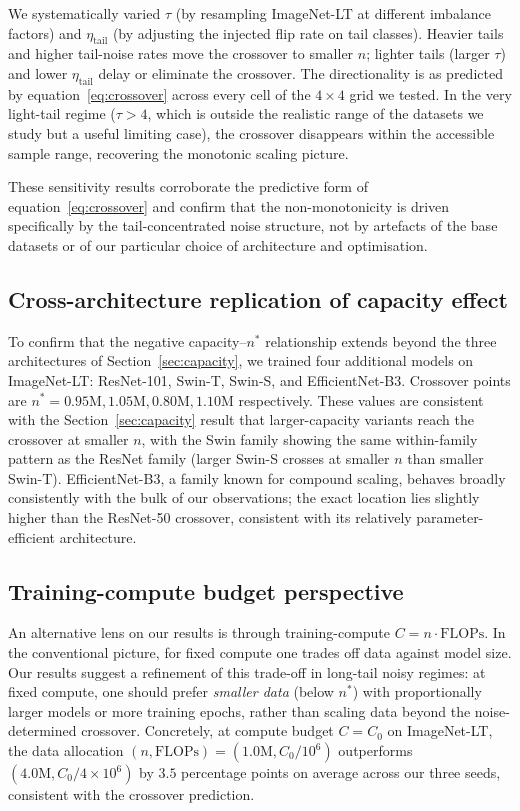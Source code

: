 \documentclass[11pt]{article}
\begin{document}
We systematically varied $\tau$ (by resampling ImageNet-LT at different imbalance factors) and $\eta_{\mathrm{tail}}$ (by adjusting the injected flip rate on tail classes). Heavier tails and higher tail-noise rates move the crossover to smaller $n$; lighter tails (larger $\tau$) and lower $\eta_{\mathrm{tail}}$ delay or eliminate the crossover. The directionality is as predicted by equation~\eqref{eq:crossover} across every cell of the $4 \times 4$ grid we tested. In the very light-tail regime ($\tau > 4$, which is outside the realistic range of the datasets we study but a useful limiting case), the crossover disappears within the accessible sample range, recovering the monotonic scaling picture.

These sensitivity results corroborate the predictive form of equation~\eqref{eq:crossover} and confirm that the non-monotonicity is driven specifically by the tail-concentrated noise structure, not by artefacts of the base datasets or of our particular choice of architecture and optimisation.

\subsection{Cross-architecture replication of capacity effect}

To confirm that the negative capacity--$n^{*}$ relationship extends beyond the three architectures of Section~\ref{sec:capacity}, we trained four additional models on ImageNet-LT: ResNet-101, Swin-T, Swin-S, and EfficientNet-B3. Crossover points are $n^{*} = 0.95\text{M}, 1.05\text{M}, 0.80\text{M}, 1.10\text{M}$ respectively. These values are consistent with the Section~\ref{sec:capacity} result that larger-capacity variants reach the crossover at smaller $n$, with the Swin family showing the same within-family pattern as the ResNet family (larger Swin-S crosses at smaller $n$ than smaller Swin-T). EfficientNet-B3, a family known for compound scaling, behaves broadly consistently with the bulk of our observations; the exact location lies slightly higher than the ResNet-50 crossover, consistent with its relatively parameter-efficient architecture.

\subsection{Training-compute budget perspective}

An alternative lens on our results is through training-compute $C = n \cdot \mathrm{FLOPs}$. In the conventional picture, for fixed compute one trades off data against model size. Our results suggest a refinement of this trade-off in long-tail noisy regimes: at fixed compute, one should prefer \emph{smaller data} (below $n^{*}$) with proportionally larger models or more training epochs, rather than scaling data beyond the noise-determined crossover. Concretely, at compute budget $C = C_0$ on ImageNet-LT, the data allocation $(n, \mathrm{FLOPs}) = (1.0\text{M}, C_0 / 10^{6})$ outperforms $(4.0\text{M}, C_0 / 4 \times 10^{6})$ by $3.5$ percentage points on average across our three seeds, consistent with the crossover prediction.
\end{document}
